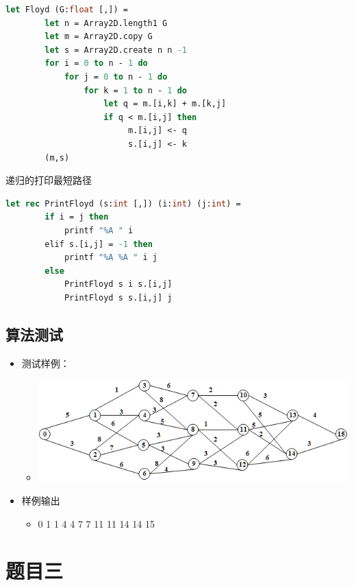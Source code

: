 \documentclass[a4paper]{article}
\begin{document}
\begin{lstlisting}[language=ML]
    let Floyd (G:float [,]) = 
        let n = Array2D.length1 G
        let m = Array2D.copy G
        let s = Array2D.create n n -1
        for i = 0 to n - 1 do
            for j = 0 to n - 1 do
                for k = 1 to n - 1 do
                    let q = m.[i,k] + m.[k,j]
                    if q < m.[i,j] then
                         m.[i,j] <- q
                         s.[i,j] <- k
        (m,s)
\end{lstlisting}

递归的打印最短路径

\begin{lstlisting}[language=ML]
    let rec PrintFloyd (s:int [,]) (i:int) (j:int) = 
        if i = j then
            printf "%A " i
        elif s.[i,j] = -1 then
            printf "%A %A " i j
        else
            PrintFloyd s i s.[i,j]
            PrintFloyd s s.[i,j] j
\end{lstlisting}

\subsection{算法测试}

\begin{itemize}
\item
    测试样例：
    \begin{itemize}
    \item
        \includegraphics[width=12cm]{4-2.png}
    \end{itemize}
\item
    样例输出
    \begin{itemize}
    \item
        0 1 1 4 4 7 7 11 11 14 14 15
    \end{itemize}
\end{itemize}

\section{题目三}
\end{document}
